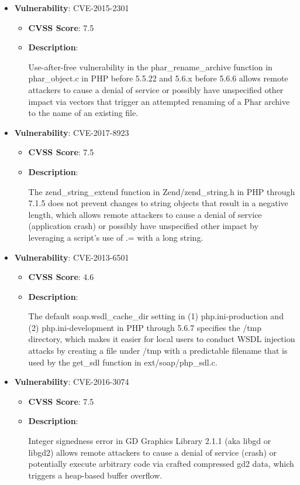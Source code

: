 \documentclass{article}
\begin{document}
\begin{itemize}
        \item \textbf{Vulnerability}: CVE-2015-2301
        \begin{itemize}
            \item \textbf{CVSS Score}:  7.5 
            \item \textbf{Description}:
            \parbox[t]{0.9\linewidth}{
                \ttfamily Use-after-free vulnerability in the phar\_rename\_archive function in phar\_object.c in PHP before 5.5.22 and 5.6.x before 5.6.6 allows remote attackers to cause a denial of service or possibly have unspecified other impact via vectors that trigger an attempted renaming of a Phar archive to the name of an existing file.
            }
        \end{itemize}
    
        \item \textbf{Vulnerability}: CVE-2017-8923
        \begin{itemize}
            \item \textbf{CVSS Score}:  7.5 
            \item \textbf{Description}:
            \parbox[t]{0.9\linewidth}{
                \ttfamily The zend\_string\_extend function in Zend/zend\_string.h in PHP through 7.1.5 does not prevent changes to string objects that result in a negative length, which allows remote attackers to cause a denial of service (application crash) or possibly have unspecified other impact by leveraging a script's use of .= with a long string.
            }
        \end{itemize}
    
        \item \textbf{Vulnerability}: CVE-2013-6501
        \begin{itemize}
            \item \textbf{CVSS Score}:  4.6 
            \item \textbf{Description}:
            \parbox[t]{0.9\linewidth}{
                \ttfamily The default soap.wsdl\_cache\_dir setting in (1) php.ini-production and (2) php.ini-development in PHP through 5.6.7 specifies the /tmp directory, which makes it easier for local users to conduct WSDL injection attacks by creating a file under /tmp with a predictable filename that is used by the get\_sdl function in ext/soap/php\_sdl.c.
            }
        \end{itemize}
    
        \item \textbf{Vulnerability}: CVE-2016-3074
        \begin{itemize}
            \item \textbf{CVSS Score}:  7.5 
            \item \textbf{Description}:
            \parbox[t]{0.9\linewidth}{
                \ttfamily Integer signedness error in GD Graphics Library 2.1.1 (aka libgd or libgd2) allows remote attackers to cause a denial of service (crash) or potentially execute arbitrary code via crafted compressed gd2 data, which triggers a heap-based buffer overflow.
            }
        \end{itemize}
    

\end{itemize}
\end{document}
